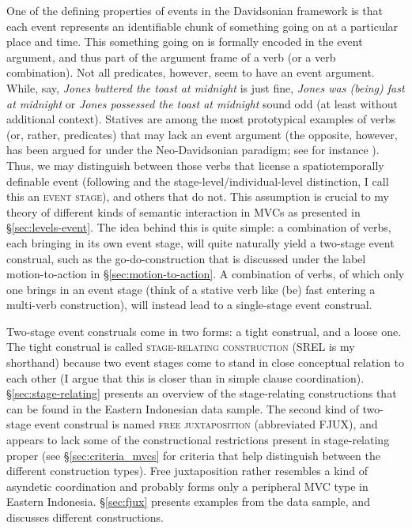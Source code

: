 One of the defining properties of events in the Davidsonian framework is that each event represents an identifiable chunk of something going on at a particular place and time. This something going on is formally encoded in the event argument, and thus part of the argument frame of a verb (or a verb combination). Not all predicates, however, seem to have an event argument. While, say, \textit{Jones buttered the toast at midnight} is just fine, \textit{Jones was (being) fast at midnight} or \textit{Jones possessed the toast at midnight} sound odd (at least without additional context). Statives are among the most prototypical examples of verbs (or, rather, predicates) that may lack an event argument (the opposite, however, has been argued for under the Neo-Davidsonian paradigm; see for instance \citealt{higginbotham2000events}). Thus, we may distinguish between those verbs that license a spatiotemporally definable event (following \citealt{carlson1977reference} and the stage-level/individual-level distinction, I call this an \textsc{event stage}), and others that do not. This assumption is crucial to my theory of different kinds of semantic interaction in MVCs as presented in §\ref{sec:levels-event}. The idea behind this is quite simple: a combination of verbs, each bringing in its own event stage, will quite naturally yield a two-stage event construal, such as the go-do-construction that is discussed under the label motion-to-action in §\ref{sec:motion-to-action}. A combination of verbs, of which only one brings in an event stage (think of a stative verb like (be) fast entering a multi-verb construction), will instead lead to a single-stage event construal.

Two-stage event construals come in two forms: a tight construal, and a loose one. The tight construal is called \textsc{stage-relating construction} (SREL is my shorthand) because two event stages come to stand in close conceptual relation to each other (I argue that this is closer than in simple clause coordination). §\ref{sec:stage-relating} presents an overview of the stage-relating constructions that can be found in the Eastern Indonesian data sample. The second kind of two-stage event construal is named \textsc{free juxtaposition} (abbreviated FJUX), and appears to lack some of the constructional restrictions present in stage-relating proper (see §\ref{sec:criteria_mvcs} for criteria that help distinguish between the different construction types). Free juxtaposition rather resembles a kind of asyndetic coordination and probably forms only a peripheral MVC type in Eastern Indonesia. §\ref{sec:fjux} presents examples from the data sample, and discusses different constructions.

